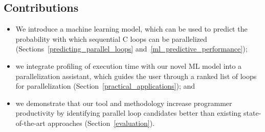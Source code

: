 \subsection{Contributions}
\begin{itemize}
\renewcommand\labelitemi{$\vartriangleright$}
\renewcommand\labelitemii{$\bullet$}
\item We introduce a machine learning model, which can be used to predict the probability with which sequential C loops can be parallelized (Sections~\ref{predicting_parallel_loops} and~\ref{ml_predictive_performance});
\item we integrate profiling of execution time with our novel ML model into a parallelization assistant, which guides the user through a ranked list of loops for parallelization (Section~\ref{practical_applications}); and
\item we demonstrate that our tool and methodology increase programmer productivity by identifying parallel loop candidates better than existing state-of-the-art approaches (Section~\ref{evaluation}).
\end{itemize}

